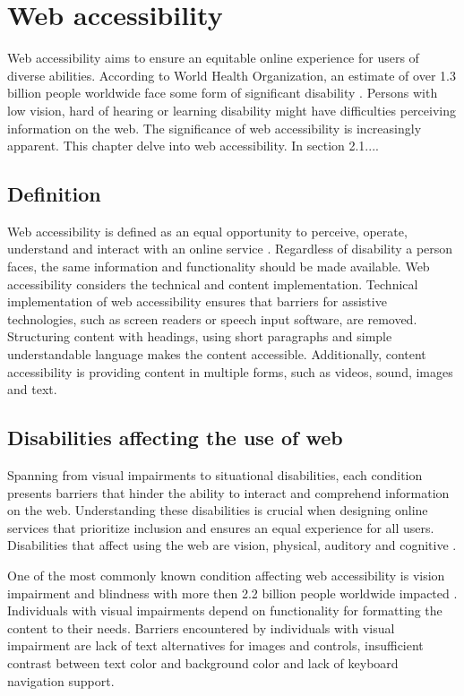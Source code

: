 \chapter{Web accessibility\label{accessibility}}

Web accessibility aims to ensure an equitable online experience for users of diverse abilities. According to World Health Organization, an estimate of over 1.3 billion people worldwide face some form of significant disability \citep{whodisability}. Persons with low vision, hard of hearing or learning disability might have difficulties perceiving information on the web. The significance of web accessibility is increasingly apparent. This chapter delve into web accessibility. In section 2.1....

\section{Definition}

Web accessibility is defined as an equal opportunity to perceive, operate, understand and interact with an online service \citep{webaccessibilitydefinition}. Regardless of disability a person faces, the same information and functionality should be made available. Web accessibility considers the technical and content implementation. Technical implementation of web accessibility ensures that barriers for assistive technologies, such as screen readers or speech input software, are removed. Structuring content with headings, using short paragraphs and simple understandable language makes the content accessible. Additionally, content accessibility is providing content in multiple forms, such as videos, sound, images and text.

\section{Disabilities affecting the use of web}

Spanning from visual impairments to situational disabilities, each condition presents barriers that hinder the ability to interact and comprehend information on the web. Understanding these disabilities is crucial when designing online services that prioritize inclusion and ensures an equal experience for all users. Disabilities that affect using the web are vision, physical, auditory and cognitive \citep{w3cbarriers}.

One of the most commonly known condition affecting web accessibility is vision impairment and blindness with more then 2.2 billion people worldwide impacted \citep[Chapter~1]{whovision, webaccessibility}. Individuals with visual impairments depend on functionality for formatting the content to their needs. Barriers encountered by individuals with visual impairment are lack of text alternatives for images and controls, insufficient contrast between text color and background color and lack of keyboard navigation support. 

